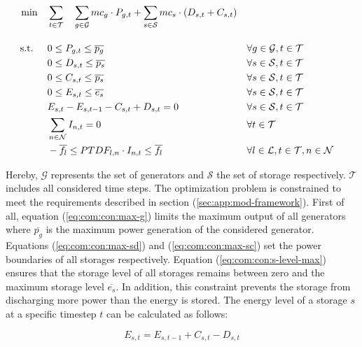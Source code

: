 \begin{subequations}
	\begin{align}
		 \min \quad & \sum_{t\in\mathcal{T}} \quad \sum_{g\in\mathcal{G}}mc_g \cdot P_{g,t} + \sum_{s\in\mathcal{S}}mc_s \cdot (D_{s,t}+C_{s,t})\\[10pt]
		 \text{s.t. } \quad & 0 \leq P_{g,t} \leq \overline{p_g} && \forall g \in \mathcal{G}, t \in \mathcal{T} \label{eq:com:con:max-g}\\
		 & 0 \leq D_{s,t} \leq \overline{p_s} && \forall s \in \mathcal{S}, t \in \mathcal{T} \label{eq:com:con:max-sd}\\
		 & 0 \leq C_{s,t} \leq \overline{p_s} && \forall s \in \mathcal{S}, t \in \mathcal{T} \label{eq:com:con:max-sc}\\
		 & 0 \leq E_{s,t} \leq \overline{e_s} && \forall s \in \mathcal{S}, t \in \mathcal{T} \label{eq:com:con:s-level-max}\\
		 & E_{s,t} - E_{s,t-1} - C_{s,t} + D_{s,t} = 0 && \forall s \in \mathcal{S}, t \in \mathcal{T} \label{eq:com:con:s-level}\\
		 & \sum_{n \in \mathcal{N}} I_{n,t} = 0 && \forall t \in \mathcal{T} \label{eq:com:con:eb}\\
		 & -\overline{f_l} \leq PTDF_{l,n} \cdot I_{n,t} \leq \overline{f_l} && \forall l \in \mathcal{L}, t \in \mathcal{T}, n \in \mathcal{N} \label{eq:com:con:pf}
	\end{align}
\end{subequations}

Hereby, $\mathcal{G}$ represents the set of generators and $\mathcal{S}$ the set of storage respectively. $\mathcal{T}$ includes all considered time steps. The optimization problem is constrained to meet the requirements described in section (\ref{sec:app:mod-framework}). First of all, equation (\ref{eq:com:con:max-g}) limits the maximum output of all generators where $\overline{p_g}$ is the maximum power generation of the considered generator. Equations (\ref{eq:com:con:max-sd}) and (\ref{eq:com:con:max-sc}) set the power boundaries of all storages respectively. Equation (\ref{eq:com:con:s-level-max}) ensures that the storage level of all storages remains between zero and the maximum storage level $\overline{e_s}$. In addition, this constraint prevents the storage from discharging more power than the energy is stored. The energy level of a storage $s$ at a specific timestep $t$ can be calculated as follows:

\begin{equation}
	\label{eq:storage-level}
	E_{s,t} = E_{s,t-1} + C_{s,t} - D_{s,t}
\end{equation}

